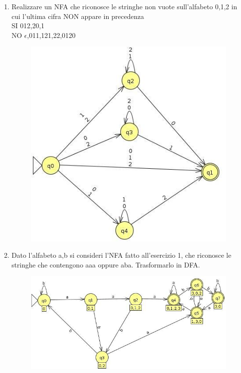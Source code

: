 \begin{enumerate}
\newpage
\item Realizzare un NFA che riconosce le stringhe non vuote sull'alfabeto {0,1,2} in cui l'ultima cifra NON appare in precedenza
\\
SI 012,20,1
\\
NO $\epsilon$,011,121,22,0120

\begin{figure}[h]
  \includegraphics[scale = 0.5]{media/es10.jpg}
  \centering
\end{figure}

\item Dato l'alfabeto {a,b} si consideri l'NFA fatto all'esercizio 1, che riconosce le stringhe che contengono aaa oppure aba. Trasformarlo in DFA.

\begin{figure}[h]
  \includegraphics[scale = 0.5]{media/es11.jpg}
  \centering
\end{figure}

\end{enumerate}

